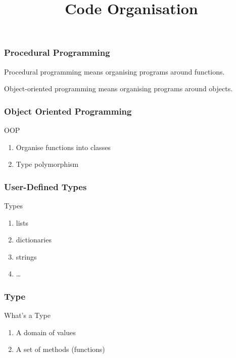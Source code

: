 
\title{Code Organisation}



\begin{frame}[fragile]
\frametitle{Procedural Programming}
\alert{Procedural programming} means organising programs around functions.

\alert{Object-oriented programming} means organising programs around objects.
\end{frame}

\begin{frame}[fragile] 
\frametitle{Object Oriented Programming}

\begin{block}{OOP}
\begin{enumerate}
\item Organise functions into classes
\item Type polymorphism
\end{enumerate}
\end{block}
\end{frame}

\begin{frame}[fragile] 
\frametitle{User-Defined Types}

\begin{block}{Types}
\begin{enumerate}
\item lists
\item dictionaries
\item strings
\item \ldots
\end{enumerate}
\end{block}
\end{frame}

\begin{frame}[fragile] 
\frametitle{Type}
\begin{block}{What's a Type}
\begin{enumerate}
\item A domain of values
\item A set of methods (functions)
\end{enumerate}
\end{block}

\end{frame}

